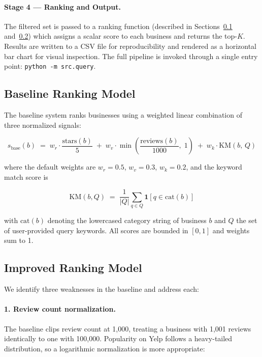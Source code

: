 \paragraph{Stage 4 — Ranking and Output.}
The filtered set is passed to a ranking function (described in
Sections~\ref{sec:baseline} and~\ref{sec:improved}) which assigns
a scalar score to each business and returns the top-$K$.
Results are written to a CSV file for reproducibility and
rendered as a horizontal bar chart for visual inspection.
The full pipeline is invoked through a single entry point:
\texttt{python -m src.query}.

\subsection{Baseline Ranking Model}
\label{sec:baseline}

The baseline system ranks businesses using a weighted linear combination
of three normalized signals:

\begin{equation}
  s_{\text{base}}(b) \;=\;
    w_r \cdot \frac{\text{stars}(b)}{5}
    \;+\; w_v \cdot \min\!\left(\frac{\text{reviews}(b)}{1000},\;1\right)
    \;+\; w_k \cdot \text{KM}(b,\,Q)
  \label{eq:baseline}
\end{equation}

\noindent where the default weights are $w_r = 0.5$, $w_v = 0.3$,
$w_k = 0.2$, and the keyword match score is

\begin{equation}
  \text{KM}(b, Q) \;=\;
    \frac{1}{|Q|}\sum_{q \in Q} \mathbf{1}\!\left[q \in \text{cat}(b)\right]
  \label{eq:km_baseline}
\end{equation}

\noindent with $\text{cat}(b)$ denoting the lowercased category string of
business $b$ and $Q$ the set of user-provided query keywords.
All scores are bounded in $[0, 1]$ and weights sum to 1.

\subsection{Improved Ranking Model}
\label{sec:improved}

We identify three weaknesses in the baseline and address each:

\paragraph{1. Review count normalization.}
The baseline clips review count at 1,000, treating a business with
1,001 reviews identically to one with 100,000.
Popularity on Yelp follows a heavy-tailed distribution, so a
logarithmic normalization is more appropriate:

